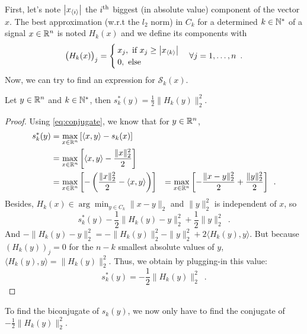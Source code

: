 First, let's note $\left|x_{\langle i\rangle}\right|$ the $i\textsuperscript{th}$ biggest (in absolute value) component of the vector $x$. The best approximation (w.r.t the $l_2$ norm) in $C_k$ for a determined $k\in\mathbb{N}^*$ of a signal $x\in\mathbb{R}^n$ is noted $H_k(x)$ and we define its components with 
\[\big(H_k(x)\big)_j = \begin{cases} x_j,\text{ if }x_j \geq \left|x_{\langle k\rangle}\right| \\
0, \text{ else }\end{cases} \forall j =1,\dots, n\enspace. \]
Now, we can try to find an expression for $\mathcal{S}_k(x)$.

\begin{proposition}\label{prop:skstar}
Let $y\in\mathbb{R}^n$ and $k\in\mathbb{N}^*$, then $s_k^*(y) = \frac{1}{2}\|H_k(y)\|^2_2$.
\end{proposition}

\begin{proof}
Using \eqref{eq:conjugate}, we know that for $y\in\mathbb{R}^n$,
\[
\begin{aligned}
s_k^*(y) & = \max_{x\in\mathbb{R}^n}\left[\langle x,y\rangle - s_k(x)\right]\\
         & = \max_{x\in\mathbb{R}^n}\left[\langle x,y\rangle - \frac{\|x\|_2^2}{2}\right]\\
         & = \max_{x\in\mathbb{R}^n}\left[-\left(\frac{\|x\|^2_2}{2} - \langle x, y\rangle\right) \right]
         & = \max_{x\in\mathbb{R}^n}\left[-\frac{\|x-y\|^2_2}{2} + \frac{\|y\|^2_2}{2} \right] \enspace.
\end{aligned}
\]
Besides, $H_k(x)\in\arg\min_{y\in C_k}\|x-y\|_2$ and $\|y\|_2^2$ is independent of $x$, so 
\[s_k^*(y) -\frac{1}{2}\|H_k(y) - y\|^2_2 + \frac{1}{2}\|y\|_2^2\enspace.\]
And $-\|H_k(y) -y\|^2_2 = -\|H_k(y)\|_2^2 - \|y\|^2_2 + 2 \langle H_k(y),y\rangle$. But because $(H_k(y))_j=0$ for the $n-k$ smallest absolute values of $y$, $\langle H_k(y),y\rangle = \|H_k(y)\|_2^2$. Thus, we obtain by plugging-in this value:
\[s_k^*(y) = -\frac{1}{2}\|H_k(y)\|_2^2\enspace.\]
\end{proof}

To find the biconjugate of $s_k(y)$, we now only have to find the conjugate of $-\frac{1}{2}\|H_k(y)\|^2_2$.
